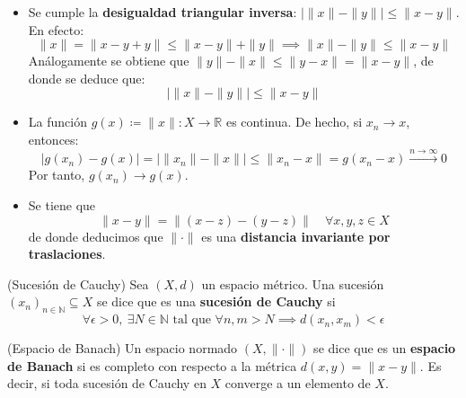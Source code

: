 \documentclass[12pt]{book}
\newcommand{\tbf}{\textbf}
\newcommand{\R}{\mathbb{R}}
\begin{document}
\begin{observacion}
    \begin{itemize}
        \item     Se cumple la \tbf{desigualdad triangular inversa}: $\big| \|x\| - \|y\| \big| \leq \|x - y\|$. En efecto:
        \begin{equation*}
            \|x\| = \|x - y + y\| \leq \|x - y\| + \|y\| \implies \|x\| - \|y\| \leq \|x - y\|
        \end{equation*}
        Análogamente se obtiene que $\|y\| - \|x\| \leq \|y - x\| = \|x - y\|$, de donde se deduce que:
        \begin{equation*}
            \big| \|x\| - \|y\| \big| \leq \|x - y\|
        \end{equation*}
        \item     La función $g(x) \coloneqq \|x\| : X \longrightarrow \R$ es continua. De hecho, si $x_n \to x$, entonces:
        \begin{equation*}
            |g(x_n) - g(x)| = \big| \|x_n\| - \|x\| \big| \leq \|x_n - x\| = g(x_n - x) \xrightarrow{n \to \infty} 0
        \end{equation*}
        Por tanto, $g(x_n) \to g(x)$.
        \item Se tiene que \begin{equation*}
            \| x-y\|=\| (x-z) - (y-z)\| \quad \forall x,y,z \in X 
        \end{equation*}
        de donde deducimos que $\|\cdot\|$ es una \tbf{distancia invariante por traslaciones}. \\
    \end{itemize}
\end{observacion}


\begin{definicion}(Sucesión de Cauchy)
    Sea $(X, d)$ un espacio métrico. Una sucesión \mbox{$(x_n)_{n \in \mathbb{N}} \subseteq X$} se dice que es una \tbf{sucesión de Cauchy} si
    $$\forall \epsilon > 0, \ \exists N \in \mathbb{N} \text{ tal que } \forall n, m > N \implies d(x_n, x_m) < \epsilon $$
\end{definicion}


\begin{definicion}(Espacio de Banach)
    Un espacio normado $(X, \|\cdot\|)$ se dice que es un \tbf{espacio de Banach} si es completo con respecto a la métrica $d(x,y) = \|x - y\|$. Es decir, si toda sucesión de Cauchy en $X$ converge a un elemento de $X$.
\end{definicion}
\end{document}
